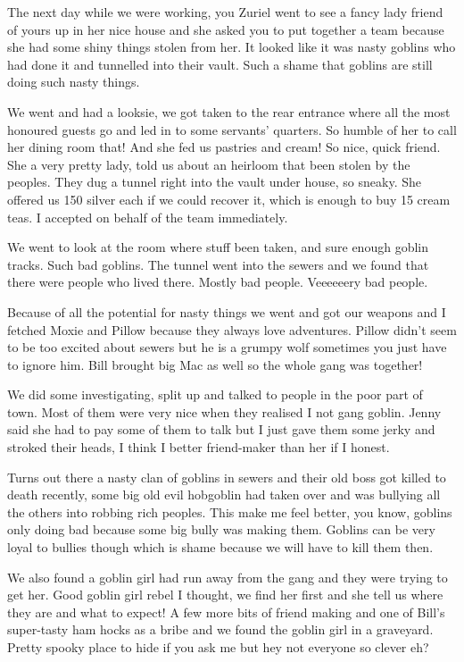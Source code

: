The next day while we were working, you Zuriel went to see a fancy lady friend of yours up in her nice house and she asked you to put together a team because she had some shiny things stolen from her. It looked like it was nasty goblins who had done it and tunnelled into their vault. Such a shame that goblins are still doing such nasty things.\medskip

We went and had a looksie, we got taken to the rear entrance where all the most honoured guests go and led in to some servants’ quarters. So humble of her to call her dining room that! And she fed us pastries and cream! So nice, quick friend. She a very pretty lady, told us about an heirloom that been stolen by the peoples. They dug a tunnel right into the vault under house, so sneaky. She offered us 150 silver each if we could recover it, which is enough to buy 15 cream teas. I accepted on behalf of the team immediately.\medskip

We went to look at the room where stuff been taken, and sure enough goblin tracks. Such bad goblins. The tunnel went into the sewers and we found that there were people who lived there. Mostly bad people. Veeeeeery bad people.\medskip

Because of all the potential for nasty things we went and got our weapons and I fetched Moxie and Pillow because they always love adventures. Pillow didn’t seem to be too excited about sewers but he is a grumpy wolf sometimes you just have to ignore him. Bill brought big Mac as well so the whole gang was together!\medskip

We did some investigating, split up and talked to people in the poor part of town. Most of them were very nice when they realised I not gang goblin. Jenny said she had to pay some of them to talk but I just gave them some jerky and stroked their heads, I think I better friend-maker than her if I honest.\medskip

Turns out there a nasty clan of goblins in sewers and their old boss got killed to death recently, some big old evil hobgoblin had taken over and was bullying all the others into robbing rich peoples. This make me feel better, you know, goblins only doing bad because some big bully was making them. Goblins can be very loyal to bullies though which is shame because we will have to kill them then.\medskip

We also found a goblin girl had run away from the gang and they were trying to get her. Good goblin girl rebel I thought, we find her first and she tell us where they are and what to expect! A few more bits of friend making and one of Bill’s super-tasty ham hocks as a bribe and we found the goblin girl in a graveyard. Pretty spooky place to hide if you ask me but hey not everyone so clever eh?\medskip


